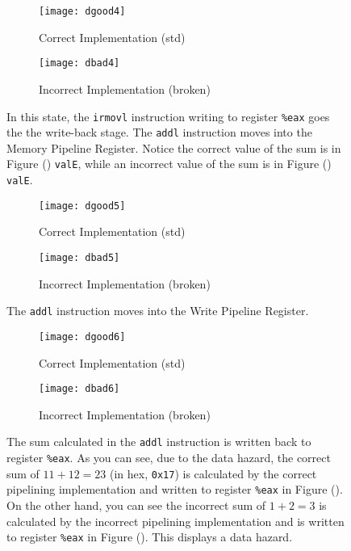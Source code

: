 \documentclass[12pt, letterpaper]{article}
\begin{document}
\begin{figure}[h]
  \begin{subfigure}{0.5\textwidth}
    \texttt{[image: dgood4]}
    \caption{Correct Implementation (std)}
    \label{fig:dgood4}
    \end{subfigure}
  \begin{subfigure}{0.5\textwidth}
    \texttt{[image: dbad4]}
    \caption{Incorrect Implementation (broken)}
    \label{fig:dbad4}
  \end{subfigure}
  \caption
{In this state, the \texttt{irmovl} instruction writing to register
\texttt{\%eax} goes the the write-back stage. The \texttt{addl} instruction
moves into the Memory Pipeline Register. Notice the correct value of the sum is
in Figure () \texttt{valE}, while an incorrect value of the
sum is in Figure () \texttt{valE}. }
  \label{fig:d4}
\end{figure}
\begin{figure}[h]
  \begin{subfigure}{0.5\textwidth}
    \texttt{[image: dgood5]}
    \caption{Correct Implementation (std)}
    \label{fig:dgood5}
    \end{subfigure}
  \begin{subfigure}{0.5\textwidth}
    \texttt{[image: dbad5]}
    \caption{Incorrect Implementation (broken)}
    \label{fig:dbad5}
  \end{subfigure}
  \caption{The \texttt{addl} instruction moves into the Write Pipeline
Register.}
  \label{fig:d5}
\end{figure}
\begin{figure}[h]
  \begin{subfigure}{0.5\textwidth}
    \texttt{[image: dgood6]}
    \caption{Correct Implementation (std)}
    \label{fig:dgood6}
    \end{subfigure}
  \begin{subfigure}{0.5\textwidth}
    \texttt{[image: dbad6]}
    \caption{Incorrect Implementation (broken)}
    \label{fig:dbad6}
  \end{subfigure}
  \caption{The sum calculated in the \texttt{addl} instruction is written back
to register \texttt{\%eax}. As you can see, due to the data hazard, the correct
sum of $11 + 12 = 23$ (in hex, \texttt{0x17}) is calculated by the correct
pipelining implementation and written to register \texttt{\%eax} in Figure 
(). \\ On the other hand, you can see the incorrect sum of $1 +
2 = 3$ is calculated by the incorrect pipelining implementation and is written
to register \texttt{\%eax} in Figure (). This displays a data
hazard.}
  \label{fig:d6}
\end{figure}
\end{document}
